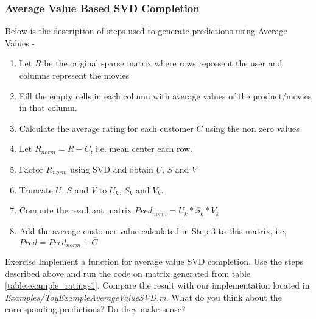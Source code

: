   \subsubsection{Average Value Based SVD Completion}
  Below is the description of steps used to generate predictions using Average Values -
  \begin{enumerate}
    \item Let $R$ be the original sparse matrix where rows represent the user and columns represent the movies
    \item Fill the empty cells in each column with average values of the product/movies in that column.
    \item Calculate the average rating for each customer $\overline{C}$ using the non zero values
    \item Let $R_{norm} = R - \overline{C}$, i.e. mean center each row. 
    \item Factor $R_{norm}$ using SVD and obtain $U$, $S$ and $V$
    \item Truncate $U$, $S$ and $V$ to $U_k$, $S_k$ and $V_k$.
    \item Compute the resultant matrix $Pred_{norm} = U_k*S_k*V_k$
    \item Add the average customer value calculated in Step 3 to this matrix, i.e, $Pred = Pred_{norm} + \overline{C} $
  \end{enumerate}
\begin{myremark}{Exercise }
Implement a function for average value SVD completion. Use the steps described above and run the code on matrix generated from table \ref{table:example_ratings1}. Compare the result with our implementation located in \textit{Examples/ToyExampleAverageValueSVD.m}. What do you think about the corresponding predictions? Do they make sense? 
\end{myremark}
